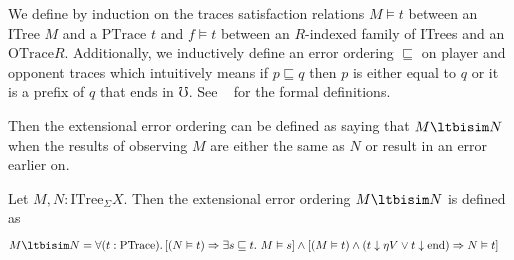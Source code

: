 \documentclass[acmsmall,screen,review,anonymous]{acmart}
\theoremstyle{remark}
\begin{document}
We define by induction on the traces satisfaction relations $M \vDash t$ between
an ITree $M$ and a $\textrm{PTrace}$ $t$ and $f \vDash t$ between an $R$-indexed
family of ITrees and an $\textrm{OTrace}R$.
%
Additionally, we inductively define an error ordering $\sqsubseteq$ on
player and opponent traces which intuitively means if $p \sqsubseteq q$ then $p$ is either
equal to $q$ or it is a prefix of $q$ that ends in $\mho$. See \citeappendix~ for the formal definitions.




%
Then the extensional error ordering can be defined as saying that $M \ltbisim N$
when the results of observing $M$ are either the same as $N$ or result in an
error earlier on. 

\begin{definition}\label{def:itree-ext-ordering}
Let $M, N : \textrm{ITree}_\Sigma X$. Then the extensional error ordering $M \ltbisim N$ is defined as
\begin{align*}
   M \ltbisim N &= \forall (t : \textrm{PTrace}).\,
   [(N \vDash t) \Rightarrow \exists s \sqsubseteq t.~ M \vDash s]
   \wedge [(M \vDash t) \wedge (t \downarrow \eta V \vee t \downarrow \textrm{end}) \Rightarrow N \vDash t]
\end{align*}
\end{definition}
\end{document}
